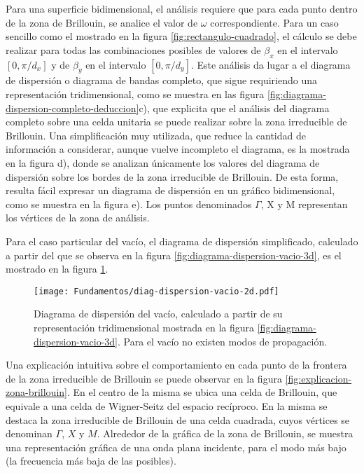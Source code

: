 Para una superficie bidimensional, el análisis requiere que para cada punto dentro de la zona de Brillouin, se analice el valor de $\omega$ correspondiente. Para un caso sencillo como el mostrado en la figura \ref{fig:rectangulo-cuadrado}, el cálculo se debe realizar para todas las combinaciones posibles de valores de $\beta_x$ en el intervalo $[0,\pi/d_x]$ y de $\beta_y$ en el intervalo $[0,\pi/d_y]$. Este análisis da lugar a el diagrama de dispersión o diagrama de bandas completo, que sigue requiriendo una representación tridimensional, como se muestra en las figura \ref{fig:diagrama-dispersion-completo-deduccion}c), que explicita que el análisis del diagrama completo sobre una celda unitaria se puede realizar sobre la zona irreducible de Brillouin. Una simplificación muy utilizada, que reduce la cantidad de información a considerar, aunque vuelve incompleto el diagrama, es la mostrada en la figura d), donde se analizan únicamente los valores del diagrama de dispersión sobre los bordes de la zona irreducible de Brillouin. De esta forma, resulta fácil expresar un diagrama de dispersión en un gráfico bidimensional, como se muestra en la figura e). Los puntos denominados $\Gamma$, X y M representan los vértices de la zona de análisis.

Para el caso particular del vacío, el diagrama de dispersión simplificado, calculado a partir del que se observa en la figura \ref{fig:diagrama-dispersion-vacio-3d}, es el mostrado en la figura \ref{fig:diagrama-dispersion-vacio-2d}.

\begin{figure}[h]
	\centering
	\texttt{[image: Fundamentos/diag-dispersion-vacio-2d.pdf]}
	\caption{Diagrama de dispersión del vacío, calculado a partir de su representación tridimensional mostrada en la figura \ref{fig:diagrama-dispersion-vacio-3d}. Para el vacío no existen modos de propagación.}
	\label{fig:diagrama-dispersion-vacio-2d}
\end{figure}

Una explicación intuitiva sobre el comportamiento en cada punto de la frontera de la zona irreducible de Brillouin se puede observar en la figura \ref{fig:explicacion-zona-brillouin}. En el centro de la misma se ubica una celda de Brillouin, que equivale a una celda de Wigner-Seitz del espacio recíproco. En la misma se destaca la zona irreducible de Brillouin de una celda cuadrada, cuyos vértices se denominan $\Gamma$, $X$ y $M$. Alrededor de la gráfica de la zona de Brillouin, se muestra una representación gráfica de una onda plana incidente, para el modo más bajo (la frecuencia más baja de las posibles).

